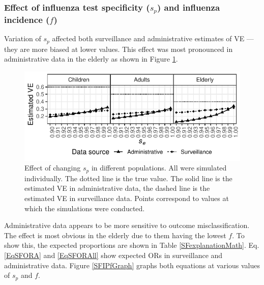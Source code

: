 \documentclass[11pt]{article}
\begin{document}
\subsubsection{Effect of influenza test specificity ($s_p$) and influenza incidence ($f$)}

Variation of $s_p$ affected both surveillance and administrative estimates of VE --- they are more biased at lower values. This effect was most pronounced in administrative data in the elderly as shown in Figure \ref{fig:agesind-spf}.

\begin{figure}[h]
	\centering
		\includegraphics[width=0.75\linewidth]{../fig-agesind/agesind-spec_flu.pdf}
		\caption{
Effect of changing $s_p$ in different populations. All were simulated individually. The dotted line is the true value. The solid line is the estimated VE in administrative data, the dashed line is the estimated VE in surveillance data. Points correspond to values at which the simulations were conducted. \label{fig:agesind-spf}
		}
\end{figure}

Administrative data appears to be more sensitive to outcome misclassification. The effect is most obvious in the elderly due to them having the lowest $f$. To show this, the expected proportions are shown in Table \ref{SFexplanationMath}. Eq. \ref{EqSFORA} and \ref{EqSFORAll} show expected ORs in surveillance and administrative data. Figure \ref{SFIPfGraph} graphs both equations at various values of $s_p$ and $f$.

\begin{table}[h]
\centering
\caption{
Expected proportions in a population. Shown for ARI and non-ARI subjects separately. Surveillance sample would only contain ARI subjects, administrative would contain everyone. $T_p$ - tested as flu-infected, $T_n$ - tested as uninfected $V$ - vaccinated, $A$ - ARI.
Assumptions: no misclassification other than $s_p$, $t_a$= 1, $t_n$= 1
\label{SFexplanationMath} 
}
	
\end{table}
\end{document}
